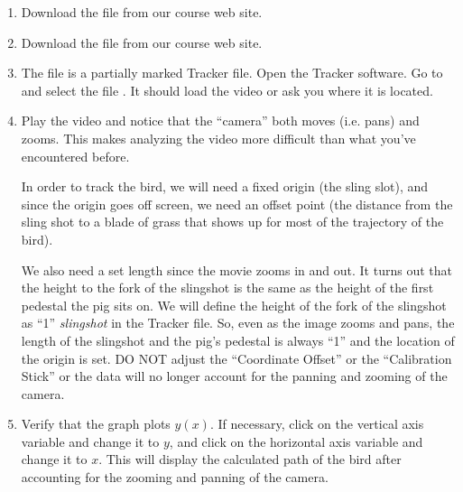 \begin{enumerate}
	\item Download the file  from our course web site.
	\item Download the file  from our course web site.
	\item The  file is a partially marked Tracker file. Open the Tracker software. Go to  and select the file . It should load the video or ask you where it is located.
	\item Play the video and notice that the ``camera'' both moves (i.e. pans) and zooms. This makes analyzing the video more difficult than what you've encountered before.

In order to track the bird, we will need a fixed origin (the sling slot), and since the origin goes off screen, we need an offset point (the distance from the sling shot to a blade of grass that shows up for most of the trajectory of the bird).

	We also need a set length since the movie zooms in and out. It turns out that the height to the fork of the slingshot is the same as the height of the first pedestal the pig sits on. We will define the height of the fork of the slingshot as ``1'' \emph{slingshot} in the Tracker file. So, even as the image zooms and pans, the length of the slingshot and the pig's pedestal is always ``1'' and the location of the origin is set. DO NOT adjust the ``Coordinate Offset'' or the ``Calibration Stick'' or the data will no longer account for the panning and zooming of the camera.
	
	
	
	\item Verify that the graph plots $y(x)$. If necessary, click on the vertical axis variable and change it to $y$, and click on the horizontal axis variable and change it to $x$. This will display the calculated path of the bird after accounting for the zooming and panning of the camera.
	
	

\end{enumerate}
